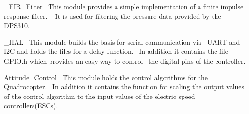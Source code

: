 \begin{DoxyItemize}
\item \+\_\+\+F\+I\+R\+\_\+\+Filter~\newline
 This module provides a simple implementation of a finite impulse response filter. ~\newline
 It is used for filtering the pressure data provided by the D\+P\+S310.
\item \+\_\+\+H\+AL~\newline
 This module builds the basis for serial communication via~\newline
 U\+A\+RT and I2C and holds the files for a delay function.~\newline
 In addition it contains the file G\+P\+I\+O.\+h which provides an easy way to control~\newline
 the digital pins of the controller.
\item Attitude\+\_\+\+Control~\newline
 This module holds the control algorithms for the Quadrocopter.~\newline
 In addition it contains the function for scaling the output values of the control algorithm to the input values of the electric speed controllers(E\+SC\textquotesingle{}s).~\newline


\end{DoxyItemize}
